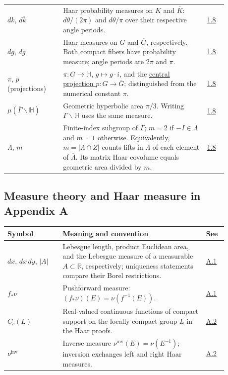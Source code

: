 \begin{longtable}{p{0.22\linewidth}p{0.58\linewidth}p{0.08\linewidth}}
$dk$, $d\overline k$ & Haar probability measures on $K$ and $\overline K$: $d\theta/(2\pi)$ and $d\theta/\pi$ over their respective angle periods. & \hyperref[measure.haar-examples]{1.8} \\
$dg$, $d\overline g$ & Haar measures on $G$ and $\overline G$, respectively. Both compact fibers have probability measure; angle periods are $2\pi$ and $\pi$. & \hyperref[modular.haar-normalizations]{1.8} \\
$\pi$, $p$ (projections) & $\pi:G\to\mathbb H$, $g\mapsto g\cdot i$, and the \hyperref[modular.haar-central-projection]{central projection $p:G\to\overline G$}; distinguished from the numerical constant $\pi$. & \hyperref[hyperbolic.haar-quotient]{1.8} \\
$\mu(\overline\Gamma\backslash\mathbb H)$ & Geometric hyperbolic area $\pi/3$. Writing $\Gamma\backslash\mathbb H$ uses the same measure. & \hyperref[modular.quotient-area]{1.8} \\
$\Lambda$, $m$ & Finite-index subgroup of $\Gamma$; $m=2$ if $-I\in\Lambda$ and $m=1$ otherwise. Equivalently, $m=|\Lambda\cap Z|$ counts lifts in $\Lambda$ of each element of $\overline\Lambda$. Its matrix Haar covolume equals geometric area divided by $m$. & \hyperref[modular.central-covolumes]{1.8} \\
\end{longtable}

\subsection*{Measure theory and Haar measure in Appendix A}\label{v1a-notation-appendix-measures}

\begin{longtable}{p{0.22\linewidth}p{0.58\linewidth}p{0.08\linewidth}}
\textbf{Symbol} & \textbf{Meaning and convention} & \textbf{See} \\ \hline
$dx$, $dx\,dy$, $|A|$ & Lebesgue length, product Euclidean area, and the Lebesgue measure of a measurable $A\subset\mathbb R$, respectively; uniqueness statements compare their Borel restrictions. & \hyperref[measure.lebesgue]{A.1} \\
$f_*\nu$ & Pushforward measure: $(f_*\nu)(E)=\nu(f^{-1}(E))$. & \hyperref[measure.pushforward]{A.1} \\
$C_c(L)$ & Real-valued continuous functions of compact support on the locally compact group $L$ in the Haar proofs. & \hyperref[measure.compact-support-functions]{A.2} \\
$\nu^{\mathrm{inv}}$ & Inverse measure $\nu^{\mathrm{inv}}(E)=\nu(E^{-1})$; inversion exchanges left and right Haar measures. & \hyperref[measure.haar-inversion]{A.2} \\
\end{longtable}
